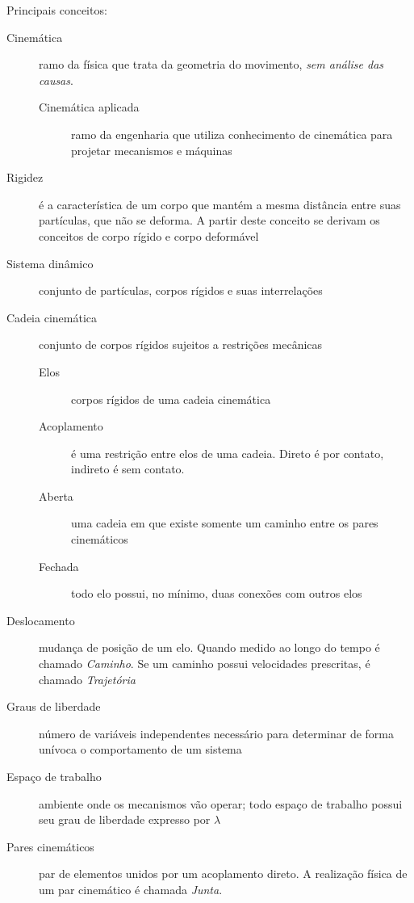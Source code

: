 
Principais conceitos:
\begin{description}
    \item[Cinemática] ramo da física que trata da geometria do movimento, \emph{sem análise das causas}.
	\begin{description}
	    \item[Cinemática aplicada] ramo da engenharia que utiliza conhecimento de cinemática para projetar mecanismos e máquinas
	\end{description}
    \item[Rigidez] é a característica de um corpo que mantém a mesma distância entre suas partículas, que não se deforma. A partir deste conceito se derivam os conceitos de corpo rígido e corpo deformável
    \item[Sistema dinâmico] conjunto de partículas, corpos rígidos e suas interrelações
    \item[Cadeia cinemática] conjunto de corpos rígidos sujeitos a restrições mecânicas
	\begin{description}
	    \item[Elos] corpos rígidos de uma cadeia cinemática
	    \item[Acoplamento] é uma restrição entre elos de uma cadeia. Direto é por contato, indireto é sem contato.
	    \item[Aberta] uma cadeia em que existe somente um caminho entre os pares cinemáticos
	    \item[Fechada] todo elo possui, no mínimo, duas conexões com outros elos
	\end{description}
    \item[Deslocamento] mudança de posição de um elo. Quando medido ao longo do tempo é chamado \emph{Caminho}. Se um caminho possui velocidades prescritas, é chamado \emph{Trajetória}
    \item[Graus de liberdade] número de variáveis independentes necessário para determinar de forma unívoca o comportamento de um sistema
    \item[Espaço de trabalho] ambiente onde os mecanismos vão operar; todo espaço de trabalho possui seu grau de liberdade expresso por $\lambda$ 
    \item[Pares cinemáticos] par de elementos unidos por um acoplamento direto. A realização física de um par cinemático é chamada \emph{Junta}.
\end{description}

